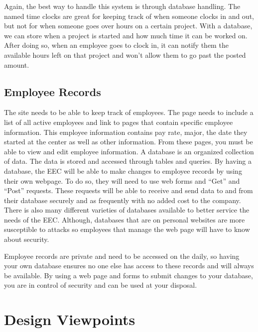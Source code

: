 \documentclass[letterpaper,10pt,titlepage,journal,compsoc,draftclsnofoot,onecolumn]{IEEEtran}
\begin{document}
\par Again, the best way to handle this system is through database handling. The named time clocks are great for keeping track of when someone clocks in and out, but not for when someone goes over hours on a certain project. With a database, we can store when a project is started and how much time it can be worked on. After doing so, when an employee goes to clock in, it can notify them the available hours left on that project and won't allow them to go past the posted amount. 

\subsection{Employee Records}

\par The site needs to be able to keep track of employees. The page needs to include a list of  all active employees and link to pages that contain specific employee information. This employee information contains pay rate, major, the date they started at the center as well as other information. From these pages, you must be able to view and edit employee information. A database is an organized collection of data. The data is stored and accessed through tables and queries. By having a database, the EEC will be able to make changes to employee records by using their own webpage. To do so, they will need to use web forms and “Get” and “Post” requests. These requests will be able to receive and send data to and from their database securely and as frequently with no added cost to the company. There is also many different varieties of databases available to better service the needs of the EEC. Although, databases that are on personal websites are more susceptible to attacks so employees that manage the web page will have to know about security. \newline

\par Employee records are private and need to be accessed on the daily, so having your own database ensures no one else has access to these records and will always be available. By using a web page and forms to submit changes to your database, you are in control of security and can be used at your disposal.

\section{Design Viewpoints}
\end{document}
